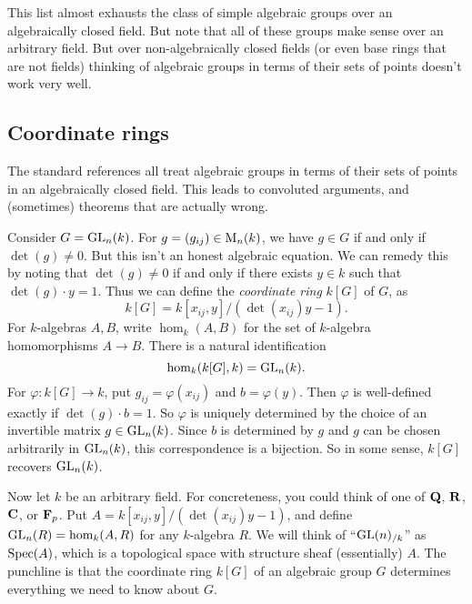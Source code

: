 This list almost exhausts the class of simple algebraic groups over an 
algebraically closed field. But note that all of these groups make sense over 
an arbitrary field. But over non-algebraically closed fields (or even base 
rings that are not fields) thinking of algebraic groups in terms of their sets 
of points doesn't work very well. 





\subsection{Coordinate rings}

The standard references \cite{borel-1991,humphreys-1975,springer-2009} all treat 
algebraic groups in terms of their sets of points in an algebraically closed 
field. This leads to convoluted arguments, and (sometimes) theorems that are 
actually wrong. 

\begin{example}
Consider $G=\operatorname{GL}_n(k)$. For $g=(g_{i j})\in \operatorname{M}_n(k)$, we have 
$g\in G$ if and only if $\det(g)\ne 0$. But this isn't an honest algebraic 
equation. We can remedy this by noting that $\det(g)\ne 0$ if and only if 
there exists $y\in k$ such that $\det(g)\cdot y=1$. Thus we can define the 
\emph{coordinate ring} $k[G]$ of $G$, as 
\[
  k[G] = k[x_{i j},y] / (\det(x_{i j})y-1) .
\]
For $k$-algebras $A,B$, write $\hom_k(A,B)$ for the set of $k$-algebra 
homomorphisms $A\to B$. There is a natural identification 
\[
  \hom_k(k[G],k) = \operatorname{GL}_n(k) .
\]
For $\varphi:k[G]\to k$, put $g_{i j} = \varphi(x_{i j})$ and 
$b=\varphi(y)$. Then $\varphi$ is well-defined exactly if 
$\det(g)\cdot b=1$. So $\varphi$ is uniquely determined by the choice of an 
invertible matrix $g\in \operatorname{GL}_n(k)$. Since $b$ is determined by $g$ and $g$ can 
be chosen arbitrarily in $\operatorname{GL}_n(k)$, this correspondence is a bijection. So in 
some sense, $k[G]$ recovers $\operatorname{GL}_n(k)$. 
\end{example}

Now let $k$ be an arbitrary field. For concreteness, you could think of one of 
$\mathbf{Q}$, $\mathbf{R}$, $\mathbf{C}$, or $\mathbf{F}_p$. Put $A=k[x_{i j},y]/(\det(x_{i j}) y-1)$, and 
define $\operatorname{GL}_n(R)=\hom_k(A,R)$ for any $k$-algebra $R$. We will think of 
``$\operatorname{GL}(n)_{/k}$'' as $\operatorname{Spec}(A)$, which is a topological space with structure 
sheaf (essentially) $A$. The punchline is that the coordinate ring 
$k[G]$ of an algebraic group $G$ determines everything we need to know about 
$G$. 

